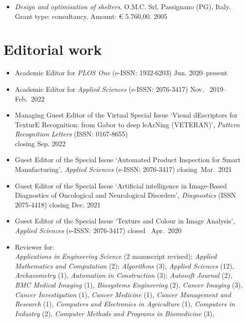 \documentclass[11pt]{article}
\begin{document}
\begin{itemize}
	\item \emph{Design and optimisation of shelters}. O.M.C. Srl, Passignano (PG), Italy. Grant type: consultancy. Amount: € 5.760,00. \hfill 2005
\end{itemize}

\section*{Editorial work}

\begin{itemize}
	\item Academic Editor for \emph{PLOS One} (e-ISSN: 1932-6203) \hfill Jun. 2020--present
	\item Academic Editor for \emph{Applied Sciences} (e-ISSN: 2076-3417) \hfill Nov.~ 2019--Feb.~2022
		\item Managing Guest Editor of the Virtual Special Issue `Visual dEscriptors for TexturE Recognition: from Gabor to deep leArNing (VETERAN)', \emph{Pattern Recognition Letters} (ISSN: 0167-8655) \\ \mbox{} \hfill closing Sep. 2022
	\item Guest Editor of the Special Issue `Automated Product Inspection for Smart Manufacturing', \emph{Applied Sciences} (e-ISSN: 2076-3417) \hfill closing~Mar.~2021
	\item Guest Editor of the Special Issue `Artificial intelligence in Image-Based Diagnostics of Oncological and Neurological Disorders', \emph{Diagnostics} (ISSN 2075-4418) \hfill closing Dec. 2021
	\item Guest Editor of the Special Issue `Texture and Colour in Image Analysis', \emph{Applied Sciences} (e-ISSN: 2076-3417) \hfill closed~ Apr.~2020
	\item Reviewer for: \\
		\emph{Applications in Engineering Science} (2 manuscript revised);
    \emph{Applied Mathematics and Computation} (2);
    \emph{Algorithms} (3),
    \emph{Applied Sciences} (12),
    \emph{Archaeometry} (1),
    \emph{Automation in Construction} (3);
    \emph{Autosoft Journal} (2),
    \emph{BMC Medical Imaging} (1),
    \emph{Biosystems Engineering} (2),
    \emph{Cancer Imaging} (3),
    \emph{Cancer Investigation} (1),
    \emph{Cancer Medicine} (1),
    \emph{Cancer Management and Research} (1),
    \emph{Computers and Electronics in Agriculture} (1),
    \emph{Computers in Industry} (2),
    \emph{Computer Methods and Programs in Biomedicine} (3),

\end{itemize}
\end{document}
